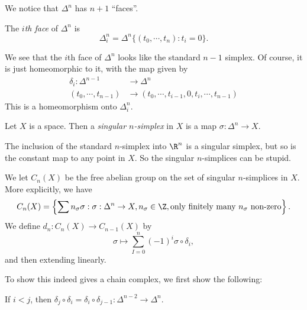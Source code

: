 \documentclass[a4paper]{article}
\begin{document}
We notice that $\Delta^n$ has $n + 1$ ``faces''.
\begin{defi}
  The \emph{$i$th face} of $\Delta^n$ is
  \[
    \Delta_i^n = \Delta^n \{(t_0, \cdots, t_n): t_i = 0\}.
  \]
\end{defi}
\begin{center}
\end{center}
We see that the $i$th face of $\Delta^n$ looks like the standard $n-1$ simplex. Of course, it is just homeomorphic to it, with the map given by
\begin{align*}
  \delta_i: \Delta^{n - 1} &\to \Delta^n\\
  (t_0, \cdots, t_{n - 1}) &\to (t_0, \cdots, t_{i - 1}, 0, t_i, \cdots, t_{n - 1})
\end{align*}
This is a homeomorphism onto $\Delta_i^n$.

\begin{defi}
  Let $X$ is a space. Then a \emph{singular $n$-simplex} in $X$ is a map $\sigma: \Delta^n \to X$.
\end{defi}

\begin{eg}
  The inclusion of the standard $n$-simplex into $\R^n$ is a singular simplex, but so is the constant map to any point in $X$. So the singular $n$-simplices can be stupid.
\end{eg}

We let $C_n(X)$ be the free abelian group on the set of singular $n$-simplices in $X$. More explicitly, we have
\[
  C_n(X) = \left\{\sum n_\sigma \sigma: \sigma: \Delta^n \to X, n_\sigma \in \Z, \text{only finitely many $n_\sigma$ non-zero}\right\}.
\]
We define $d_n: C_n(X) \to C_{n - 1}(X)$ by
\[
  \sigma \mapsto \sum_{I = 0}^n (-1)^i \sigma \circ \delta_i,
\]
and then extending linearly.

To show this indeed gives a chain complex, we first show the following:
\begin{lemma}
  If $i < j$, then $\delta_j \circ \delta_i = \delta_i \circ \delta_{j - 1} : \Delta^{n - 2} \to \Delta^n$.
\end{lemma}
\end{document}
